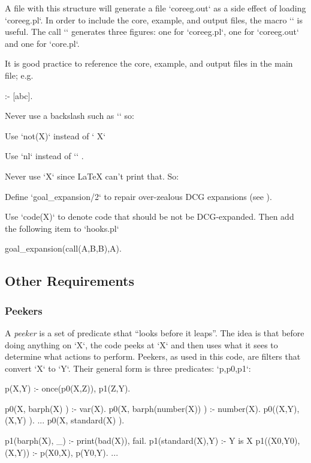 A file with this structure will generate a file `coreeg.out` as a
side effect of loading `coreeg.pl`. In order to include the core,
example, and output files, the macro `` is useful. The
call `` generates three figures: one for `coreeg.pl`,
one for `coreeg.out` and one for `core.pl`.

It is good practice to reference the core, example, and output
files in the main file; e.g.
\begin{LISTING}
:-  [abc]. %
\end{LISTING}



Never use a backslash such as `\X` so: \bi \item Use `not(X)` instead
of `\+ X` \item Use `nl` instead of  `\n` . \ei

Never use `{X}` since {\LaTeX} can't print that. So: \bi \item Define
`goal_expansion/2` to repair over-zealous DCG expansions (see
). \item Use `code(X)` to denote code that should be
not be DCG-expanded. Then add the following item to `hooks.pl`

\begin{LISTING}
goal_expansion(call(A,B,B),A).
\end{LISTING}

\ei
\subsection{Other Requirements}

\subsubsection{Peekers}

A {\em peeker} is a set of predicate sthat  ``looks before it
leaps''. The idea is that before doing anything on `X`, the code
peeks at `X` and then uses what it sees to determine what actions to
perform. Peekers, as used in this code, are filters that convert `X`
to `Y`. Their general form is three predicates: `p,p0,p1`:

\begin{LISTING}
p(X,Y) :- once(p0(X,Z)), p1(Z,Y).

p0(X,          barph(X) ) :- var(X). %
p0(X,  barph(number(X)) ) :- number(X). %
p0((X,Y),         (X,Y) ). ...
p0(X,       standard(X) ). %

p1(barph(X),  _)   :- print(bad(X)), fail.
p1(standard(X),Y)  :- Y is X %
p1((X0,Y0), (X,Y)) :- p(X0,X), p(Y0,Y). ...
\end{LISTING}

